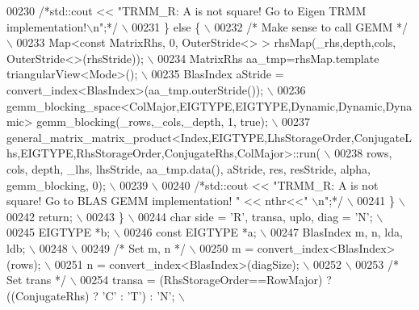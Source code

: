 \begin{DoxyCode}
00230 \textcolor{preprocessor}{       }\textcolor{comment}{/*std::cout << "TRMM\_R: A is not square! Go to Eigen TRMM implementation!\(\backslash\)n";*/}\textcolor{preprocessor}{ \(\backslash\)}
00231 \textcolor{preprocessor}{     \} else \{ \(\backslash\)}
00232 \textcolor{preprocessor}{     }\textcolor{comment}{/* Make sense to call GEMM */}\textcolor{preprocessor}{ \(\backslash\)}
00233 \textcolor{preprocessor}{       Map<const MatrixRhs, 0, OuterStride<> > rhsMap(\_rhs,depth,cols, OuterStride<>(rhsStride)); \(\backslash\)}
00234 \textcolor{preprocessor}{       MatrixRhs aa\_tmp=rhsMap.template triangularView<Mode>(); \(\backslash\)}
00235 \textcolor{preprocessor}{       BlasIndex aStride = convert\_index<BlasIndex>(aa\_tmp.outerStride()); \(\backslash\)}
00236 \textcolor{preprocessor}{       gemm\_blocking\_space<ColMajor,EIGTYPE,EIGTYPE,Dynamic,Dynamic,Dynamic>
       gemm\_blocking(\_rows,\_cols,\_depth, 1, true); \(\backslash\)}
00237 \textcolor{preprocessor}{      
       general\_matrix\_matrix\_product<Index,EIGTYPE,LhsStorageOrder,ConjugateLhs,EIGTYPE,RhsStorageOrder,ConjugateRhs,ColMajor>::run( \(\backslash\)}
00238 \textcolor{preprocessor}{       rows, cols, depth, \_lhs, lhsStride, aa\_tmp.data(), aStride, res, resStride, alpha, gemm\_blocking,
       0); \(\backslash\)}
00239 \textcolor{preprocessor}{\(\backslash\)}
00240 \textcolor{preprocessor}{     }\textcolor{comment}{/*std::cout << "TRMM\_R: A is not square! Go to BLAS GEMM implementation! " << nthr<<" \(\backslash\)n";*/}\textcolor{preprocessor}{ \(\backslash\)}
00241 \textcolor{preprocessor}{     \} \(\backslash\)}
00242 \textcolor{preprocessor}{     return; \(\backslash\)}
00243 \textcolor{preprocessor}{   \} \(\backslash\)}
00244 \textcolor{preprocessor}{   char side = 'R', transa, uplo, diag = 'N'; \(\backslash\)}
00245 \textcolor{preprocessor}{   EIGTYPE *b; \(\backslash\)}
00246 \textcolor{preprocessor}{   const EIGTYPE *a; \(\backslash\)}
00247 \textcolor{preprocessor}{   BlasIndex m, n, lda, ldb; \(\backslash\)}
00248 \textcolor{preprocessor}{\(\backslash\)}
00249 \textcolor{preprocessor}{}\textcolor{comment}{/* Set m, n */}\textcolor{preprocessor}{ \(\backslash\)}
00250 \textcolor{preprocessor}{   m = convert\_index<BlasIndex>(rows); \(\backslash\)}
00251 \textcolor{preprocessor}{   n = convert\_index<BlasIndex>(diagSize); \(\backslash\)}
00252 \textcolor{preprocessor}{\(\backslash\)}
00253 \textcolor{preprocessor}{}\textcolor{comment}{/* Set trans */}\textcolor{preprocessor}{ \(\backslash\)}
00254 \textcolor{preprocessor}{   transa = (RhsStorageOrder==RowMajor) ? ((ConjugateRhs) ? 'C' : 'T') : 'N'; \(\backslash\)}

\end{DoxyCode}
